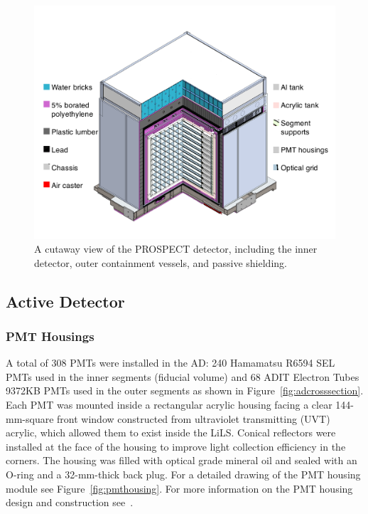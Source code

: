 \begin{figure}[t]
	\centering
	\includegraphics[width=0.8\linewidth]{tex/4-prospect-images/AD}
	\caption{A cutaway view of the PROSPECT detector, including the inner detector, outer containment vessels, and passive shielding.}
	\label{fig:ad}
\end{figure}

\subsection{Active Detector} \label{sec:InnerDetector}

\subsubsection{PMT Housings}

A total of 308 PMTs were installed in the AD: 240 Hamamatsu R6594 SEL PMTs used in the inner segments (fiducial volume) and 68 ADIT Electron Tubes 9372KB PMTs used in the outer segments as shown in Figure~\ref{fig:adcrosssection}.
Each PMT was mounted inside a rectangular acrylic housing facing a clear 144-mm-square front window constructed from ultraviolet transmitting (UVT) acrylic, which allowed them to exist inside the LiLS. 
Conical reflectors were installed at the face of the housing to improve light collection efficiency in the corners. 
The housing was filled with optical grade mineral oil and sealed with an O-ring and a 32-mm-thick back plug. 
For a detailed drawing of the PMT housing module see Figure~\ref{fig:pmthousing}.
For more information on the PMT housing design and construction see~\cite{LongNIM}.

